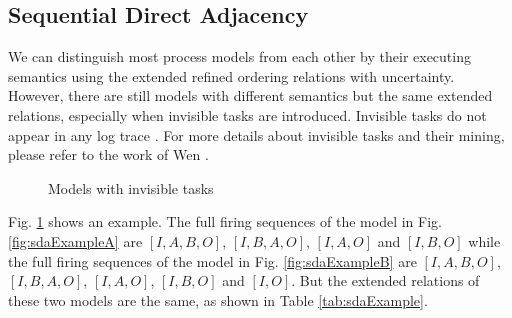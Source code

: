 \documentclass{llncs}
\begin{document}
\subsection{Sequential Direct Adjacency}\label{subsec:sda}
We can distinguish most process models from each other by their executing semantics using the extended refined ordering relations with uncertainty. However, there are still models with different semantics but the same extended relations, especially when invisible tasks are introduced. Invisible tasks do not appear in any log trace \cite{de2003workflow} . For more details about invisible tasks and their mining, please refer to the work of Wen \cite{wen2007mining}. 

\begin{figure}[ht]
\centering
{}
\hspace{0.5cm}
\caption{Models with invisible tasks}
\label{fig:sdaExample}
\end{figure}

Fig. \ref{fig:sdaExample} shows an example. The full firing sequences of the model in Fig. \ref{fig:sdaExampleA} are $[I,A,B,O]$, $[I,B,A,O]$, $[I,A,O]$ and $[I,B,O]$ while the full firing sequences of the model in Fig. \ref{fig:sdaExampleB} are $[I,A,B,O]$, $[I,B,A,O]$, $[I,A,O]$, $[I,B,O]$ and $[I,O]$. But the extended relations of these two models are the same, as shown in Table \ref{tab:sdaExample}.
\end{document}
